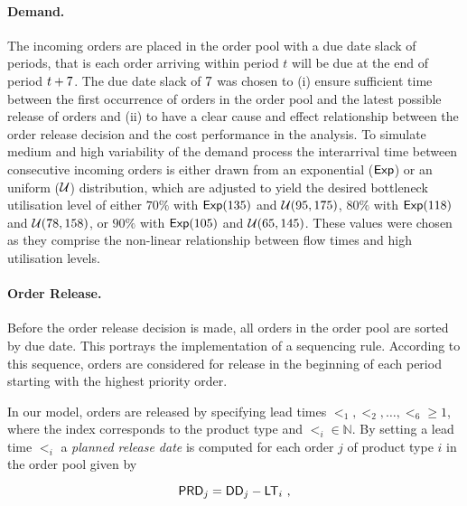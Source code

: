 \documentclass[envcountsame]{llncs}
\begin{document}
\paragraph{Demand.} The incoming orders are placed in the order pool with a due date slack of
\dds{} periods, that is each order arriving within period $t$ will be due at the end of period
$t+7{}$. The due date slack of \(7{}\) was chosen to (i) ensure sufficient time between the
first occurrence of orders in the order pool and the latest possible release of orders and (ii) to
have a clear cause and effect relationship between the order release decision and the cost
performance in the analysis.
%
To simulate medium and high variability of the demand process the interarrival time between
consecutive incoming orders is either drawn from an exponential ($\mathsf{Exp}$) or an uniform ($\mathcal{U}$)
distribution, which are adjusted to yield the desired bottleneck utilisation level of either $70\%$
with $\mathsf{Exp}(135)$ and $\mathcal{U}(95,175)$, $80\%$ with $\mathsf{Exp}(118)$ and $\mathcal{U}(78,158)$, or $90\%$ with
$\mathsf{Exp}(105)$ and $\mathcal{U}(65,145)$. These values were chosen as they comprise the non-linear
relationship between flow times and high utilisation levels.

\paragraph{Order Release.}
%
Before the order release decision is made, all orders in the order pool are sorted by due date. This
portrays the implementation of a sequencing rule. According to this sequence, orders are considered
for release in the beginning of each period starting with the highest priority order.

In our model, orders are released by specifying lead times
$\lt_{1}, \lt_{2}, \ldots, \lt_{6} \geqslant 1$, where the index corresponds to the product type and
$\lt_{i} \in \mathbb{N}$.
%
%
By setting a lead time $\lt_{i}$ a \emph{planned release date} is computed for each
order $j$ of product type $i$ in the order pool given by
%
\begin{linenomath*}
  \begin{equation}
    \mathsf{PRD}{}_j= \mathsf{DD}{}_j - \mathsf{LT}_{i}\ ,
    \label{eq:Orel}
  \end{equation}
\end{linenomath*}
\end{document}
